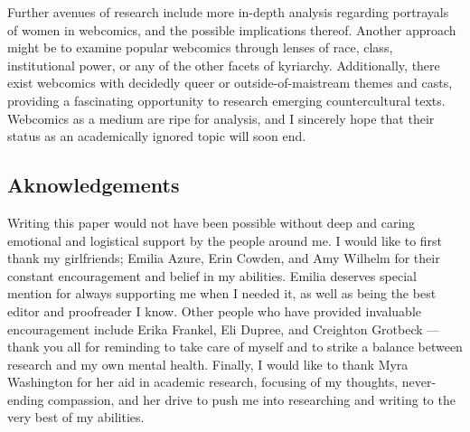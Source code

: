 \documentclass[man,12pt]{apa6}
\begin{document}
Further avenues of research include more in-depth analysis regarding portrayals of women in webcomics, and the possible implications thereof. Another approach might be to examine popular webcomics through lenses of race, class, institutional power, or any of the other facets of kyriarchy. Additionally, there exist webcomics with decidedly queer or outside-of-maistream themes and casts, providing a fascinating opportunity to research emerging countercultural texts. Webcomics as a medium are ripe for analysis, and I sincerely hope that their status as an academically ignored topic will soon end. 

\subsection{Aknowledgements}
Writing this paper would not have been possible without deep and caring emotional and logistical support by the people around me. I would like to first thank my girlfriends; Emilia Azure, Erin Cowden, and Amy Wilhelm for their constant encouragement and belief in my abilities. Emilia deserves special mention for always supporting me when I needed it, as well as being the best editor and proofreader I know. Other people who have provided invaluable encouragement include Erika Frankel, Eli Dupree, and Creighton Grotbeck --- thank you all for reminding to take care of myself and to strike a balance between research and my own mental health. Finally, I would like to thank Myra Washington for her aid in academic research, focusing of my thoughts, never-ending compassion, and her drive to push me into researching and writing to the very best of my abilities.



\end{document}
